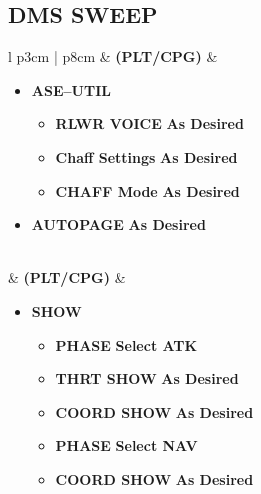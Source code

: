 \documentclass[fontHelvetica]{TechCheck}
\begin{document}
	\subsection{DMS SWEEP}
	\begin{center}
		\begin{longtable}{l p{3cm} | p{8cm}}
			\toprule
			\textbf{\textbullet} &  \textbf{(PLT/CPG)} &
			\begin{minipage}[t]{\linewidth}
				\vspace{-7pt}
				\begin{itemize}
					\item \textbf{ASE--UTIL}
					\begin{itemize}
						\item \textbf{RLWR VOICE} \dotfill \textbf{As Desired}
						\item \textbf{Chaff Settings} \dotfill \textbf{As Desired}
						\item \textbf{CHAFF Mode} \dotfill \textbf{As Desired}
					\end{itemize}
					\item \textbf{AUTOPAGE} \dotfill \textbf{As Desired}
				\end{itemize}
			\end{minipage} \\
			\midrule
			\textbf{\textbullet} &  \textbf{(PLT/CPG)} &
			\begin{minipage}[t]{\linewidth}
				\vspace{-7pt}
				\begin{itemize}
					\item \textbf{SHOW}
					\begin{itemize}
						\item \textbf{PHASE} \dotfill \textbf{Select ATK}
						\item \textbf{THRT SHOW} \dotfill \textbf{As Desired}
						\item \textbf{COORD SHOW} \dotfill \textbf{As Desired}
						\item \textbf{PHASE} \dotfill \textbf{Select NAV}
						\item \textbf{COORD SHOW} \dotfill \textbf{As Desired}
					\end{itemize}

\end{itemize}
\end{minipage}
\end{longtable}
\end{center}
\end{document}
